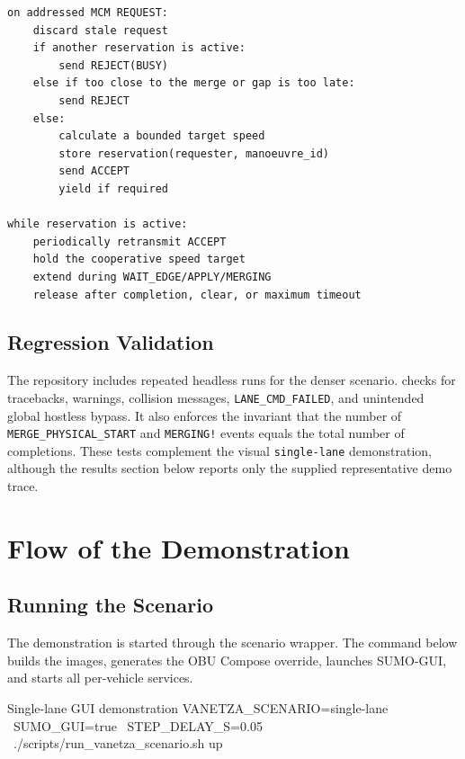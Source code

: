\documentclass[a4paper,12pt]{article}
\begin{document}
\begin{lstlisting}[style=pseudocode,caption={Simplified host-vehicle decision loop.},label={lst:host}]
on addressed MCM REQUEST:
    discard stale request
    if another reservation is active:
        send REJECT(BUSY)
    else if too close to the merge or gap is too late:
        send REJECT
    else:
        calculate a bounded target speed
        store reservation(requester, manoeuvre_id)
        send ACCEPT
        yield if required

while reservation is active:
    periodically retransmit ACCEPT
    hold the cooperative speed target
    extend during WAIT_EDGE/APPLY/MERGING
    release after completion, clear, or maximum timeout
\end{lstlisting}

\subsection{Regression Validation}

The repository includes repeated headless runs for the denser scenario.  checks for tracebacks, warnings, collision messages, \texttt{LANE\_CMD\_FAILED}, and unintended global hostless bypass. It also enforces the invariant that the number of \texttt{MERGE\_PHYSICAL\_START} and \texttt{MERGING!} events equals the total number of completions. These tests complement the visual \texttt{single-lane} demonstration, although the results section below reports only the supplied representative demo trace.

\section{Flow of the Demonstration}

\subsection{Running the Scenario}

The demonstration is started through the scenario wrapper. The command below builds the images, generates the OBU Compose override, launches SUMO-GUI, and starts all per-vehicle services.

\begin{terminalbox}{Single-lane GUI demonstration}
VANETZA_SCENARIO=single-lane \
SUMO_GUI=true \
STEP_DELAY_S=0.05 \
./scripts/run_vanetza_scenario.sh up
\end{terminalbox}
\end{document}

